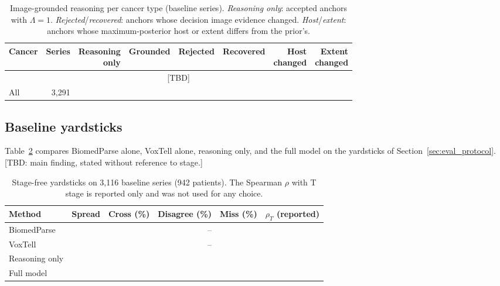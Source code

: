 \documentclass[fleqn,10pt]{olplainarticle}
\begin{document}
\begin{table}[t]
\centering\small
\caption{Image-grounded reasoning per cancer type (baseline series). \emph{Reasoning only}: accepted anchors with
$\Lambda=1$. \emph{Rejected}/\emph{recovered}: anchors whose decision image evidence changed. \emph{Host}/\emph{extent}:
anchors whose maximum-posterior host or extent differs from the prior's.}
\label{tab:r2_by_type}
\setlength{\tabcolsep}{4pt}\footnotesize
\begin{tabular}{lrrrrrrr}
\hline
Cancer & Series & \shortstack{Reasoning\\only} & Grounded & Rejected & Recovered & \shortstack{Host\\changed} & \shortstack{Extent\\changed}\\
\hline
\multicolumn{8}{c}{[TBD]}\\
\hline
All & 3{,}291 & & & & & & \\
\hline
\end{tabular}
\end{table}

\subsection{Baseline yardsticks}
\label{sec:results_yardsticks}
Table~\ref{tab:yardsticks} compares BiomedParse alone, VoxTell alone, reasoning only, and the full model on the
yardsticks of Section~\ref{sec:eval_protocol}. [TBD: main finding, stated without reference to stage.]

\begin{table}[t]
\centering\small
\caption{Stage-free yardsticks on 3{,}116 baseline series (942 patients). The Spearman $\rho$ with T stage is reported
only and was not used for any choice.}
\label{tab:yardsticks}
\begin{tabular}{lrrrrr}
\hline
Method & Spread & Cross (\%) & Disagree (\%) & Miss (\%) & $\rho_T$ (reported)\\
\hline
BiomedParse & & & -- & & \\
VoxTell & & & -- & & \\
Reasoning only & & & & & \\
Full model & & & & & \\
\hline
\end{tabular}
\end{table}
\end{document}
